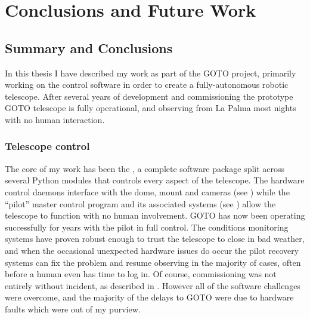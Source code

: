 \chapter{Conclusions and Future Work}
\label{chap:conclusion}
\chaptoc{}


\newpage
\section{Summary and Conclusions}
\label{sec:conclusion}
\begin{colsection}


\begin{colsection}

In this thesis I have described my work as part of the GOTO project, primarily working on the control software in order to create a fully-autonomous robotic telescope. After several years of development and commissioning the prototype GOTO telescope is fully operational, and observing from La Palma most nights with no human interaction.

\end{colsection}


\subsection{Telescope control}
\label{sec:control_results}
\begin{colsection}

The core of my work has been the , a complete software package split across several Python modules that controls every aspect of the telescope. The hardware control daemons interface with the dome, mount and cameras (see ) while the ``pilot'' master control program and its associated systems (see ) allow the telescope to function with no human involvement. GOTO has now been operating successfully for years with the pilot in full control. The conditions monitoring systems have proven robust enough to trust the telescope to close in bad weather, and when the occasional unexpected hardware issues do occur the pilot recovery systems can fix the problem and resume observing in the majority of cases, often before a human even has time to log in. Of course, commissioning was not entirely without incident, as described in . However all of the software challenges were overcome, and the majority of the delays to GOTO were due to hardware faults which were out of my purview.


\end{colsection}
\end{colsection}
